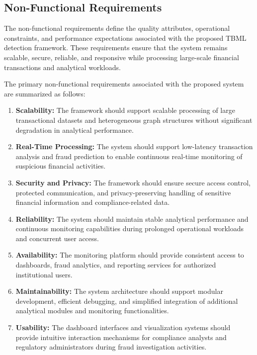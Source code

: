 \subsection[Non-Functional Requirements]{\textbf{Non-Functional Requirements}}

The non-functional requirements define the quality attributes, operational constraints, and performance expectations associated with the proposed TBML detection framework. These requirements ensure that the system remains scalable, secure, reliable, and responsive while processing large-scale financial transactions and analytical workloads.

The primary non-functional requirements associated with the proposed system are summarized as follows:
\renewcommand{\theenumi}{\roman{enumi}}\renewcommand{\labelenumi}{\textbf{ (\theenumi)}}%

\begin{enumerate}
\item \textbf{Scalability:}  
The framework should support scalable processing of large transactional datasets and heterogeneous graph structures without significant degradation in analytical performance.

\item \textbf{Real-Time Processing:}  
The system should support low-latency transaction analysis and fraud prediction to enable continuous real-time monitoring of suspicious financial activities.

\item \textbf{Security and Privacy:}  
The framework should ensure secure access control, protected communication, and privacy-preserving handling of sensitive financial information and compliance-related data.

\item \textbf{Reliability:}  
The system should maintain stable analytical performance and continuous monitoring capabilities during prolonged operational workloads and concurrent user access.

\item \textbf{Availability:}  
The monitoring platform should provide consistent access to dashboards, fraud analytics, and reporting services for authorized institutional users.

\item \textbf{Maintainability:}  
The system architecture should support modular development, efficient debugging, and simplified integration of additional analytical modules and monitoring functionalities.

\item \textbf{Usability:}  
The dashboard interfaces and visualization systems should provide intuitive interaction mechanisms for compliance analysts and regulatory administrators during fraud investigation activities.

\end{enumerate}


